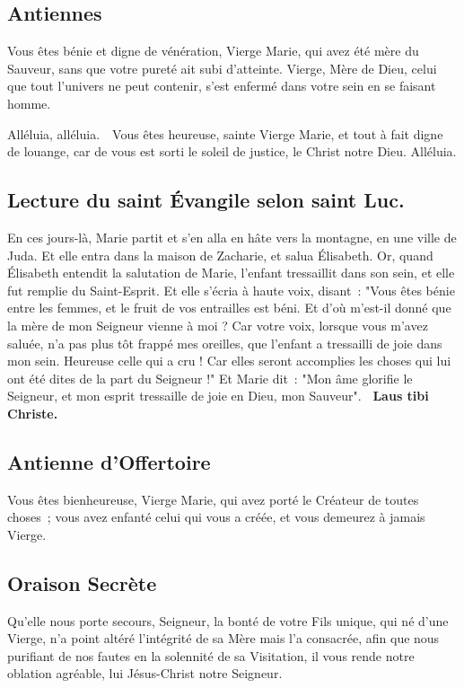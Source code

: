\begin{multicols}{2}
\subsection*{Antiennes}
Vous êtes bénie et digne de vénération, Vierge Marie, qui avez été mère du Sauveur, sans que votre pureté ait subi d’atteinte. Vierge, Mère de Dieu, celui que tout l’univers ne peut contenir, s’est enfermé dans votre sein en se faisant homme.

Alléluia, alléluia. \vb\ Vous êtes heureuse, sainte Vierge Marie, et tout à fait digne de louange, car de vous est sorti le soleil de justice, le Christ notre Dieu. Alléluia.

\subsection*{Lecture du saint Évangile selon saint Luc.}
En ces jours-là, Marie partit et s’en alla en hâte vers la montagne, en une ville de Juda. Et elle entra dans la maison de Zacharie, et salua Élisabeth. Or, quand Élisabeth entendit la salutation de Marie, l’enfant tressaillit dans son sein, et elle fut remplie du Saint-Esprit. Et elle s’écria à haute voix, disant~: "Vous êtes bénie entre les femmes, et le fruit de vos entrailles est béni. Et d’où m’est-il donné que la mère de mon Seigneur vienne à moi ? Car votre voix, lorsque vous m’avez saluée, n’a pas plus tôt frappé mes oreilles, que l’enfant a tressailli de joie dans mon sein. Heureuse celle qui a cru ! Car elles seront accomplies les choses qui lui ont été dites de la part du Seigneur !" Et Marie dit~: "Mon âme glorifie le Seigneur, et mon esprit tressaille de joie en Dieu, mon Sauveur".
{\textbf {\rb\ Laus tibi Christe.}}


\subsection*{Antienne d'Offertoire}
Vous êtes bienheureuse, Vierge Marie, qui avez porté le Créateur de toutes choses ; vous avez enfanté celui qui vous a créée, et vous demeurez à jamais Vierge.

\subsection*{Oraison Secrète}
Qu’elle nous porte secours, Seigneur, la bonté de votre Fils unique, qui né d’une Vierge, n’a point altéré l’intégrité de sa Mère mais l’a consacrée, afin que nous purifiant de nos fautes en la solennité de sa Visitation, il vous rende notre oblation agréable, lui Jésus-Christ notre Seigneur.


\end{multicols}
